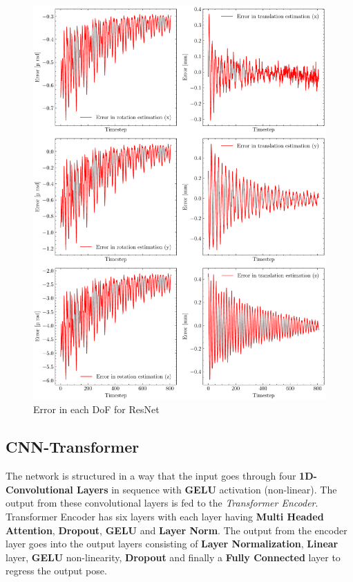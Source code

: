 \begin{figure}[H]
    \centering
    \includegraphics[scale=0.52]{images/fig_chapter4/nn_related/error_in_predicted_vs_ground_truth_resnet.pdf}
    \caption{Error in each DoF for ResNet}
    \label{fig:resnet_error}
\end{figure}


\subsection{CNN-Transformer}
The network is structured in a way that the input goes through four \textbf{1D-Convolutional Layers} in sequence with \textbf{GELU} activation (non-linear). The output from these convolutional layers is fed to the \textit{Transformer Encoder}. Transformer Encoder has six layers with each layer having \textbf{Multi Headed Attention}, \textbf{Dropout}, \textbf{GELU} and \textbf{Layer Norm}. The output from the encoder layer goes into the output layers consisting of \textbf{Layer Normalization}, \textbf{Linear} layer, \textbf{GELU} non-linearity, \textbf{Dropout} and finally a \textbf{Fully Connected} layer to regress the output pose.


